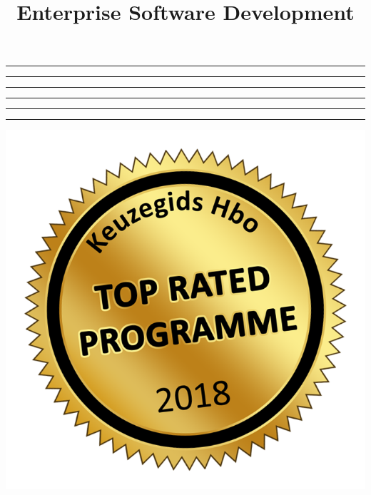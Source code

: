 \title{Enterprise Software Development}
\def\TitleImage{fontys-logo.pdf}
\providecommand\TopicBreak{\vspace{5mm}\hrule\vspace{5mm}}

\maketitle

\clearpage

\TopicBreak

\TopicBreak

\TopicBreak

\TopicBreak

\TopicBreak

\TopicBreak

%
\pagebreak%

\vspace{1.5cm}
\begin{center}
\includegraphics[width=.5\linewidth]{images/toprated2018-rot.png}
\end{center}

